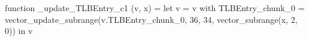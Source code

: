 function _update_TLBEntry_c1 (v, x) = let v = { v with TLBEntry_chunk_0 = vector_update_subrange(v.TLBEntry_chunk_0, 36, 34, vector_subrange(x, 2, 0)) } in v
